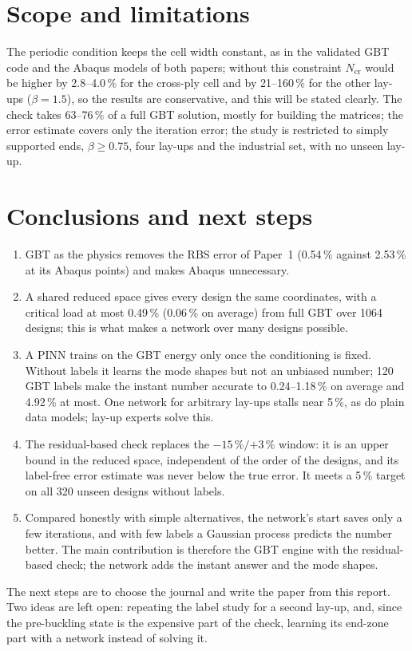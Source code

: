 \documentclass[11pt,a4paper]{article}
\newcommand{\pc}{\,\%}
\newcommand{\Ncr}{N_{\mathrm{cr}}}
\begin{document}
\section{Scope and limitations}
The periodic condition keeps the cell width constant, as in the validated GBT code and the Abaqus models of both papers; without this constraint $\Ncr$ would be higher by 2.8--4.0\pc{} for the cross-ply cell and by 21--160\pc{} for the other lay-ups ($\beta=1.5$), so the results are conservative, and this will be stated clearly. The check takes 63--76\pc{} of a full GBT solution, mostly for building the matrices; the error estimate covers only the iteration error; the study is restricted to simply supported ends, $\beta\ge0.75$, four lay-ups and the industrial set, with no unseen lay-up.

\section{Conclusions and next steps}
\begin{enumerate}[leftmargin=*]
\item GBT as the physics removes the RBS error of Paper~1 (0.54\pc{} against 2.53\pc{} at its Abaqus points) and makes Abaqus unnecessary.
\item A shared reduced space gives every design the same coordinates, with a critical load at most 0.49\pc{} (0.06\pc{} on average) from full GBT over 1064 designs; this is what makes a network over many designs possible.
\item A PINN trains on the GBT energy only once the conditioning is fixed. Without labels it learns the mode shapes but not an unbiased number; 120 GBT labels make the instant number accurate to 0.24--1.18\pc{} on average and 4.92\pc{} at most. One network for arbitrary lay-ups stalls near 5\pc, as do plain data models; lay-up experts solve this.
\item The residual-based check replaces the $-15\pc/{+3}\pc$ window: it is an upper bound in the reduced space, independent of the order of the designs, and its label-free error estimate was never below the true error. It meets a 5\pc{} target on all 320 unseen designs without labels.
\item Compared honestly with simple alternatives, the network's start saves only a few iterations, and with few labels a Gaussian process predicts the number better. The main contribution is therefore the GBT engine with the residual-based check; the network adds the instant answer and the mode shapes.
\end{enumerate}
The next steps are to choose the journal and write the paper from this report. Two ideas are left open: repeating the label study for a second lay-up, and, since the pre-buckling state is the expensive part of the check, learning its end-zone part with a network instead of solving it.
\end{document}
